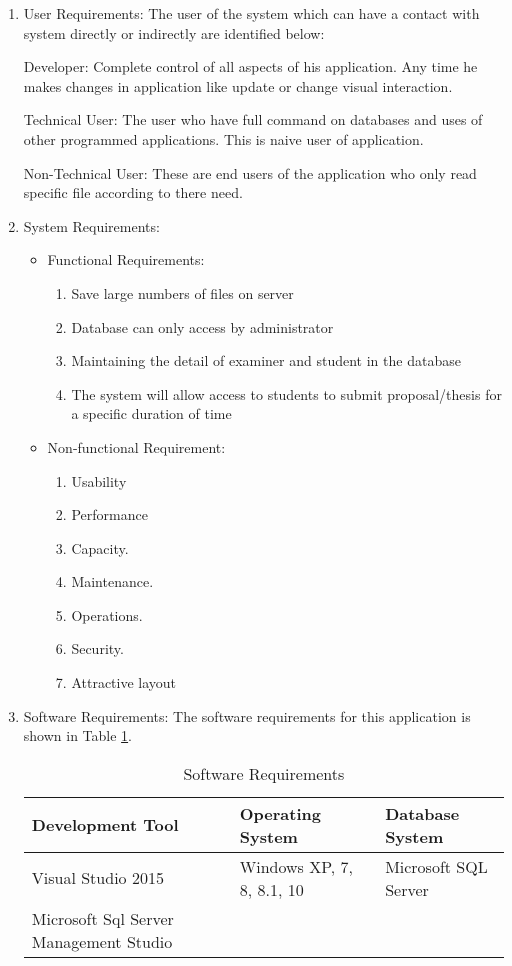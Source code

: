 	\begin{enumerate}
		\item User Requirements: The user of the system which can have a contact with system directly or indirectly are identified below:
	\par Developer: Complete control of all aspects of his application. Any time he makes changes in application like update or change visual interaction.
	\par Technical User: The user who have full command on databases and uses of other programmed applications. This is naive user of application.
	\par Non-Technical User: These are end users of the application who only read specific file according to there need.
	\enlargethispage{-\baselineskip}
	\item System Requirements: 
	\begin{itemize}
			\item Functional Requirements:
			\begin{enumerate}
		\item Save large numbers of files on server
	\item Database can only access by administrator
	\item Maintaining the detail of examiner and student in the database
	\item The system will allow access to students to submit proposal/thesis for a specific duration of time
	\end{enumerate}
	\item Non-functional Requirement:
	\begin{enumerate}
		\item  Usability
	\item Performance
	\item Capacity.
	\item Maintenance.
	\item Operations.
	\item Security.
	\item Attractive layout
	\end{enumerate}
		\end{itemize}
	
		\item Software Requirements:
	The software requirements for this application is shown in Table \ref{Software Requirements}.
	\begin{table}[]
\centering
\begin{tabular}{|l|l|l|}
\hline
 \bfseries Development Tool & \bfseries Operating System & \bfseries Database System \\ 
\hline
Visual Studio 2015 & Windows XP, 7, 8, 8.1, 10 & Microsoft SQL Server  \\
\hline
Microsoft Sql Server Management Studio & &  \\
\hline
\end{tabular}
\caption{Software Requirements}
\label{Software Requirements}
\end{table}


\end{enumerate}
